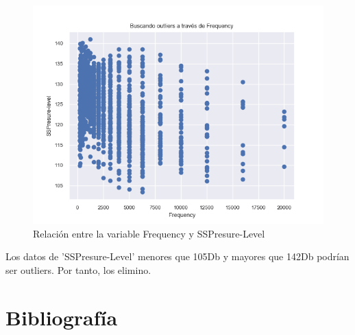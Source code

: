\begin{figure}[H] %
	\centering
	\includegraphics[scale=0.6]{freq-ssp.png}  %
	\caption{Relación entre la variable Frequency y SSPresure-Level} 
	\label{fig:freq-ssp}
\end{figure}

Los datos de 'SSPresure-Level' menores que 105Db y mayores que 142Db podrían ser  outliers. Por tanto, los elimino.


\newpage
\section{Bibliografía}




